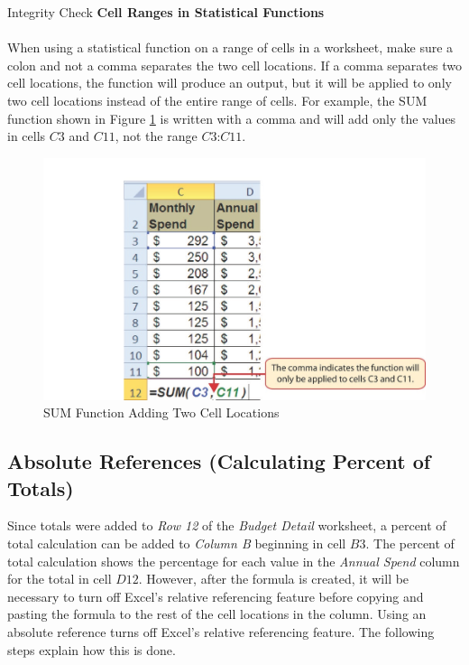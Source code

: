\begin{center}
	\begin{infobox}{Integrity Check}
		\textbf{Cell Ranges in Statistical Functions}
		\\
		\\
		When using a statistical function on a range of cells in a worksheet, make sure a colon and not a comma separates the two cell locations. If a comma separates two cell locations, the function will produce an output, but it will be applied to only two cell locations instead of the entire range of cells. For example, the SUM function shown in Figure \ref{02:fig13} is written with a comma and will add only the values in cells $ C3 $ and $ C11 $, not the range $ C3 $:$ C11 $.
	\end{infobox}
\end{center}

\begin{figure}[H]
	\centering
	\includegraphics[width=\maxwidth{.95\linewidth}]{gfx/ch02_fig13}
	\caption{SUM Function Adding Two Cell Locations}
	\label{02:fig13}
\end{figure}

\subsection{Absolute References (Calculating Percent of Totals)}

Since totals were added to \textit{Row 12} of the \textit{Budget Detail} worksheet, a percent of total calculation can be added to \textit{Column B} beginning in cell $ B3 $. The percent of total calculation shows the percentage for each value in the \textit{Annual Spend} column for the total in cell $ D12 $. However, after the formula is created, it will be necessary to turn off Excel's relative referencing feature before copying and pasting the formula to the rest of the cell locations in the column. Using an absolute reference turns off Excel's relative referencing feature. The following steps explain how this is done.

